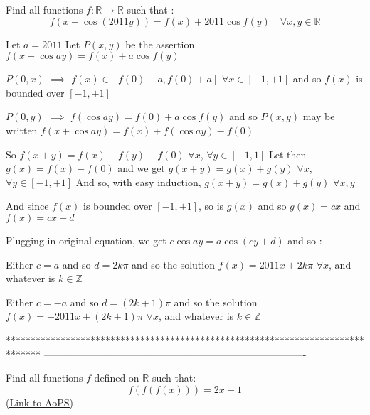 \begin{solution}
	\begin{tcolorbox}Find all functions $f:\mathbb{R} \to \mathbb{R}$ such that :
\[f\left( {x + \cos (2011y)} \right) = f(x) + 2011\cos f(y)\quad \forall x,y \in \mathbb{R}\]\end{tcolorbox}
Let $a=2011$
Let $P(x,y)$ be the assertion $f(x+\cos ay)=f(x)+a\cos f(y)$

$P(0,x)$ $\implies$ $f(x)\in[f(0)-a,f(0)+a]$ $\forall x\in[-1,+1]$ and so $f(x)$ is bounded over $[-1,+1]$

$P(0,y)$ $\implies$ $f(\cos ay)=f(0)+a\cos f(y)$ and so $P(x,y)$ may be written $f(x+\cos ay)=f(x)+f(\cos ay)-f(0)$

So $f(x+y)=f(x)+f(y)-f(0)$ $\forall x$, $\forall y\in[-1,1]$
Let then $g(x)=f(x)-f(0)$ and we get $g(x+y)=g(x)+g(y)$ $\forall x$, $\forall y\in[-1,+1]$
And so, with easy induction, $g(x+y)=g(x)+g(y)$ $\forall x,y$

And since $f(x)$ is bounded over $[-1,+1]$, so is $g(x)$ and so $g(x)=cx$ and $f(x)=cx+d$

Plugging in original equation, we get $c\cos ay= a\cos (cy+d)$ and so :

Either $c=a$ and so $d=2k\pi$ and so the solution $\boxed{f(x)=2011x+2k\pi}$ $\forall x$, and whatever is $k\in\mathbb Z$

Either $c=-a$ and so $d=(2k+1)\pi$ and so the solution $\boxed{f(x)=-2011x+(2k+1)\pi}$ $\forall x$, and whatever is $k\in\mathbb Z$
\end{solution}
*******************************************************************************
-------------------------------------------------------------------------------

\begin{problem}
	Find all functions $f$ defined on $\mathbb R$ such that:
\[f(f(f(x))) = 2x-1\]
	\flushright \href{https://artofproblemsolving.com/community/c6h566546}{(Link to AoPS)}
\end{problem}



